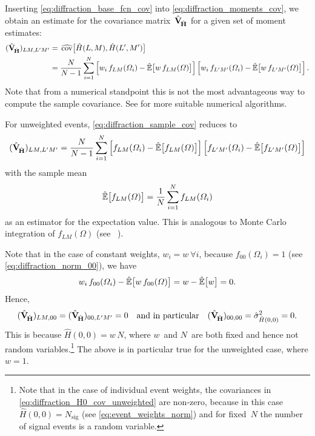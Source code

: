 Inserting \cref{eq:diffraction_base_fcn_cov} into
\cref{eq:diffraction_moments_cov}, we obtain an estimate for the
covariance matrix~$\hat{\bm{\mathrm{V}}}_{\!\hat{\bm{\mathrm{H}}}}$ for a given set
of moment estimates:
\begin{align}
  (\covMatEstSym_{\!\hat{\vect{H}}})_{L M, L' M'}
  ={}& \covEst[1]{\hat{H}(L, M), \hat{H}(L', M')} \nonumber
  \\
  \label{eq:diffraction_sample_cov}
  ={}& \frac{N}{N - 1} \sum_{i = 1}^N
  \sBrk[2]{w_i\, f_{L M}(\Omega_i) - \exptValEst[1]{w\, f_{L M}(\Omega)}} \sBrk[2]{w_i\, f_{L' M'}(\Omega_i) - \exptValEst[1]{w\, f_{L' M'}(\Omega)}}.
\end{align}
Note that from a numerical standpoint this is not the most
advantageous way to compute the sample covariance.  See
 for more suitable numerical
algorithms.

For unweighted events, \cref{eq:diffraction_sample_cov} reduces to
\begin{equation}
  (\covMatEstSym_{\!\hat{\vect{H}}})_{L M, L' M'}
  = \frac{N}{N - 1} \sum_{i = 1}^N \sBrk[2]{f_{L M}(\Omega_i) - \exptValEst[1]{f_{L M}(\Omega)}} \sBrk[2]{f_{L' M'}(\Omega_i) - \exptValEst[1]{f_{L' M'}(\Omega)}}
\end{equation}
with the sample mean
\begin{equation}
  \exptValEst[1]{f_{L M}(\Omega)}
  = \frac{1}{N} \sum_{i = 1}^N f_{L M}(\Omega_i)
\end{equation}
as an estimator for the expectation value.  This is analogous to Monte
Carlo integration of $f_{L M}(\Omega)$ (see \eg\
).

Note that in the case of constant weights, \ie $w_i = w~ \forall i$,
because $f_{0 0}(\Omega_i) = 1$ (see \cref{eq:diffraction_norm_00}),
we have
\begin{equation}
  w_i\, f_{0 0}(\Omega_i) - \exptValEst[1]{w\, f_{0 0}(\Omega)}
  = w - \exptValEst[1]{w}
  = 0.
\end{equation}
Hence,
\begin{equation}
  \label{eq:diffraction_H0_cov_unweighted}
  (\hat{\bm{\mathrm{V}}}_{\!\hat{\bm{\mathrm{H}}}})_{L M, 0 0}
  = (\hat{\bm{\mathrm{V}}}_{\!\hat{\bm{\mathrm{H}}}})_{0 0, L' M'}
  = 0
  \quad\text{and in particular}\quad
  (\hat{\bm{\mathrm{V}}}_{\!\hat{\bm{\mathrm{H}}}})_{0 0, 0 0}
  = \hat{\sigma}^2_{\hat{H}(0, 0)}
  = 0.
\end{equation}
This is because $\hat{H}(0, 0) = w\, N$, where $w$~and $N$~are both
fixed and hence not random variables.\footnote{Note that in the case
of individual event weights, the covariances in
\cref{eq:diffraction_H0_cov_unweighted} are non-zero, because in this
case $\hat{H}(0, 0) = N_\text{sig}$ (see \cref{eq:event_weights_norm})
and for fixed~$N$ the number of signal events is a random variable.}
The above is in particular true for the unweighted case, where $w =
1$.

